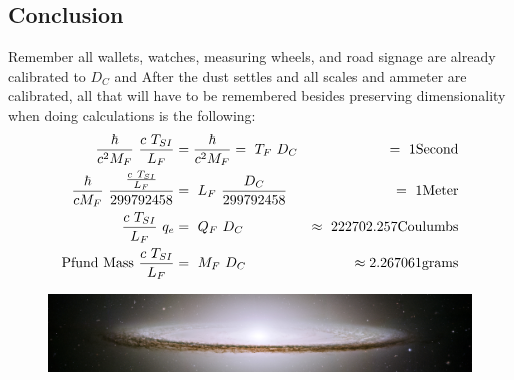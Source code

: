 \begin{multicols}{2}
\section{Conclusion}
Remember all wallets, watches, measuring wheels, and road signage are already calibrated to $D_C$ and After the dust settles and all scales and ammeter are calibrated, all that will have to be remembered besides preserving dimensionality when doing calculations is the following:
\begin{align*}
{\hbar \over c^2 M_F}~{c ~ T_{SI}\over L_F} &={\hbar \over c^2 M_F}=~T_F~D_C &= ~1 \text{Second} \\
{\hbar \over c M_F}~{{c ~ T_{SI}\over L_F}\over 299792458} &=~L_F~{D_C\over 299792458}  &= ~1 \text{Meter}\\
{c ~ T_{SI}\over L_F}~q_e&= ~Q_F~D_C &\approx~222702.257\text{Coulumbs} \\
\text{Pfund Mass}~{c ~ T_{SI}\over L_F} &=~M_F~D_C &\approx 2.267061 \text{grams}
\end{align*}
\pagebreak
\end{multicols}
\begin{figure}[h]
  \centering
  \includegraphics[width=\textwidth]{UWsombrero.jpg}
\end{figure}
